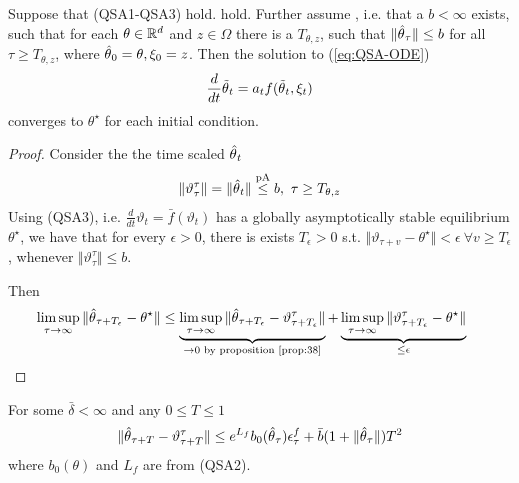 
\begin{theorem}\label{thm:39}
    Suppose that (QSA1-QSA3) hold. %
    hold. Further assume , i.e. that a \(b<\infty\) exists,
    such that for each \(\theta\in \mathbb{R}^d\) and \(z\in\Omega\) there is a \(T_{\theta,z}\),
    such that \(\Vert {\hat{\theta}}_\tau \Vert \leq b\) for all \(\tau\geq T_{\theta,z}\), where 
    \({\hat{\theta}}_0=\theta,\xi_0=z\). Then the solution to (\ref{eq:QSA-ODE}) %
    \[\frac{d}{dt}{\tilde{\theta}}_t=a_t f({\tilde{\theta}}_t,\xi_t)\] 
    converges to \(\theta^\star\) for each initial condition.
\end{theorem} 

\begin{proof}
    Consider the the time scaled \({\hat{\theta}}_t\)
    \begin{align*}
        \Vert \vartheta_{\tau}^\tau\Vert = \Vert {\hat{\theta}}_t\Vert \stackrel{\text{pA}}{\leq} b,\ \tau\geq T_{\theta,z}
    \end{align*}
    Using (QSA3), i.e. \(\frac{d}{dt}\vartheta_t=\bar{f}(\vartheta_t)\) has a globally asymptotically stable
    equilibrium \(\theta^\star\), we have that for every \(\epsilon>0\), there is exists 
    \(T_\epsilon>0\) s.t. \(\Vert \vartheta_{\tau+v}-\theta^\star\Vert<\epsilon\ \forall v\geq T_\epsilon\),
    whenever \(\Vert \vartheta_\tau^\tau\Vert \leq b\).

    Then 
    \begin{align*}
        \limsup_{\tau\to\infty} \Vert {\hat{\theta}}_{\tau+T_\epsilon}-\theta^\star\Vert &\leq \underbrace{\limsup_{\tau\to\infty}\Vert {\hat{\theta}}_{\tau+T_\epsilon}-\vartheta_{\tau+T_\epsilon}^\tau\Vert}_{\to 0 \text{ by proposition \ref{prop:38}}} + \underbrace{\limsup_{\tau\to\infty}\Vert \vartheta_{\tau+T_\epsilon}^\tau-\theta^\star\Vert}_{\leq \epsilon} \qedhere
    \end{align*}
\end{proof}

\begin{lemma}\label{lem:40}
    For some \(\bar{\delta}<\infty\) and any \(0\leq T\leq 1\)
    \[\Vert {\hat{\theta}}_{\tau+T}-\vartheta_{\tau+T}^\tau\Vert \leq e^{L_f}b_0({\hat{\theta}}_\tau)\epsilon_{\tau}^f+\bar{b}(1+\Vert {\hat{\theta}}_\tau\Vert)T^2\]
    where \(b_0(\theta)\) and \(L_f\) are from (QSA2).
\end{lemma}

